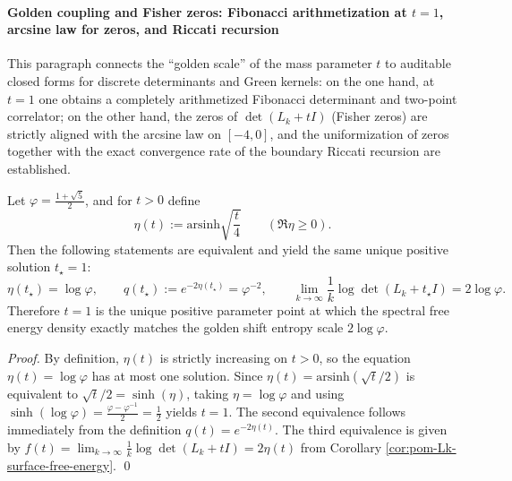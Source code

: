 \paragraph{Golden coupling and Fisher zeros: Fibonacci arithmetization at \texorpdfstring{\(t=1\)}{t=1}, arcsine law for zeros, and Riccati recursion}
This paragraph connects the ``golden scale'' of the mass parameter \(t\) to auditable closed forms for discrete determinants and Green kernels:
on the one hand, at \(t=1\) one obtains a completely arithmetized Fibonacci determinant and two-point correlator;
on the other hand, the zeros of \(\det(L_k+tI)\) (Fisher zeros) are strictly aligned with the arcsine law on \([-4,0]\), and the uniformization of zeros together with the exact convergence rate of the boundary Riccati recursion are established.

\begin{corollary}[Uniqueness of the ``golden coupling'': equivalent characterizations at \texorpdfstring{\(t=1\)}{t=1}]\label{cor:pom-Lk-golden-coupling-unique}
Let \(\varphi=\frac{1+\sqrt5}{2}\), and for \(t>0\) define
\[
\eta(t):=\mathrm{arsinh}\sqrt{\frac{t}{4}}\qquad(\Re\eta\ge 0).
\]
Then the following statements are equivalent and yield the same unique positive solution \(t_\star=1\):
\[
\eta(t_\star)=\log\varphi,
\qquad
q(t_\star):=e^{-2\eta(t_\star)}=\varphi^{-2},
\qquad
\lim_{k\to\infty}\frac{1}{k}\log\det(L_k+t_\star I)=2\log\varphi.
\]
Therefore \(t=1\) is the unique positive parameter point at which the spectral free energy density exactly matches the golden shift entropy scale \(2\log\varphi\).
\end{corollary}
\begin{proof}
By definition, \(\eta(t)\) is strictly increasing on \(t>0\), so the equation \(\eta(t)=\log\varphi\) has at most one solution.
Since
\(
\eta(t)=\mathrm{arsinh}(\sqrt{t}/2)
\)
is equivalent to \(\sqrt{t}/2=\sinh(\eta)\),
taking \(\eta=\log\varphi\) and using
\(
\sinh(\log\varphi)=\frac{\varphi-\varphi^{-1}}{2}=\frac12
\)
yields \(t=1\).
The second equivalence follows immediately from the definition \(q(t)=e^{-2\eta(t)}\).
The third equivalence is given by \(f(t)=\lim_{k\to\infty}\frac1k\log\det(L_k+tI)=2\eta(t)\) from Corollary \ref{cor:pom-Lk-surface-free-energy}. \qed
\end{proof}

